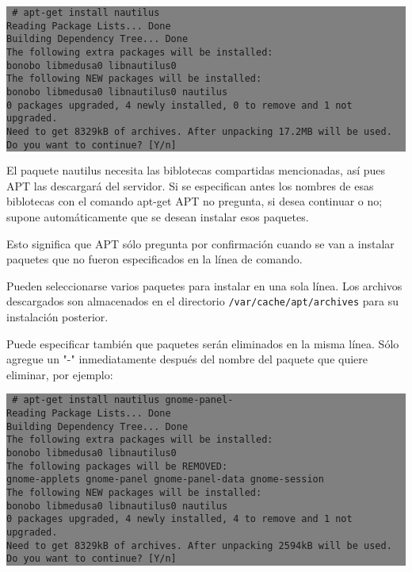 \documentclass[12pt]{article}
\begin{document}
\colorbox{grey}{\parbox[t]{0.95\linewidth}{ \vspace*{0.5cm} {\tt
     \# apt-get install nautilus \\ 
     Reading Package Lists... Done \\
     Building Dependency Tree... Done\\
     The following extra packages will be installed:\\
       bonobo libmedusa0 libnautilus0\\
     The following NEW packages will be installed:\\
       bonobo libmedusa0 libnautilus0 nautilus\\
     0 packages upgraded, 4 newly installed, 0 to remove and 1 not upgraded.\\
     Need to get 8329kB of archives. After unpacking 17.2MB will be used.\\
     Do you want to continue? [Y/n]\\
 } \vspace*{0.5cm} } } 

El paquete nautilus necesita las biblotecas compartidas mencionadas, así pues APT las descargará del servidor. Si se especifican antes los nombres de esas biblotecas con el comando apt-get APT no pregunta, si desea continuar o no; supone automáticamente que se desean instalar esos paquetes.

Esto significa que APT sólo pregunta por confirmación cuando se van a instalar paquetes que no fueron especificados en la línea de comando.

Pueden seleccionarse varios paquetes para instalar en una sola línea. Los archivos descargados son almacenados en el directorio \texttt{/var/cache/apt/archives} para su instalación posterior.

Puede especificar también que paquetes serán eliminados en la misma línea. Sólo agregue un "-" inmediatamente después del nombre del paquete que quiere eliminar, por ejemplo:

\colorbox{grey}{\parbox[t]{0.95\linewidth}{ \vspace*{0.5cm} {\tt
     \# apt-get install nautilus gnome-panel-\\
     Reading Package Lists... Done\\
     Building Dependency Tree... Done\\
     The following extra packages will be installed:\\
       bonobo libmedusa0 libnautilus0\\
     The following packages will be REMOVED:\\
       gnome-applets gnome-panel gnome-panel-data gnome-session\\
     The following NEW packages will be installed:\\
       bonobo libmedusa0 libnautilus0 nautilus\\
     0 packages upgraded, 4 newly installed, 4 to remove and 1 not upgraded.\\
     Need to get 8329kB of archives. After unpacking 2594kB will be used.\\
     Do you want to continue? [Y/n]\\
 } \vspace*{0.5cm} } } 
\end{document}
